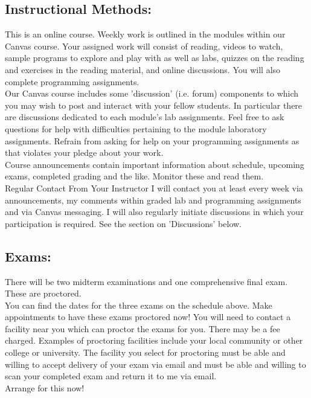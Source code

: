 \documentclass{article}
\begin{document}
\subsection{Instructional Methods:}

This is an online course. Weekly work is outlined in the modules within our Canvas course. Your assigned work will consist of reading, videos to watch, sample programs to explore and play with as well as labs, quizzes on the reading and exercises in the reading material, and online discussions. You will also complete programming assignments.
\\
Our Canvas course includes some 'discussion' (i.e. forum) components to which you may wish to post and interact with your fellow students. In particular there are discussions dedicated to each module's lab assignments.  Feel free to ask questions for help with difficulties pertaining to the module laboratory assignments. Refrain from asking for help on your programming assignments as that violates your pledge about your work.
\\
Course announcements contain important information about schedule, upcoming exams, completed grading and the like.  Monitor these and read them.
\\
Regular Contact From Your Instructor
I will contact you at least every week via announcements, my comments within graded lab and programming assignments and via Canvas messaging.  I will also regularly initiate discussions in which your participation is required.  See the section on 'Discussions' below.

\subsection{Exams:}

There will be two midterm examinations and one comprehensive final exam. These are proctored.
\\
You can find the dates for the three exams on the schedule above. Make appointments to have these exams proctored now! You will need to contact a facility near you which can proctor the exams for you. There may be a fee charged. Examples of proctoring facilities include your local community or other college or university. The facility you select for proctoring must be able and willing to accept delivery of your exam via email and must be able and willing to scan your completed exam and return it to me via email.
\\
Arrange for this now!
\end{document}
